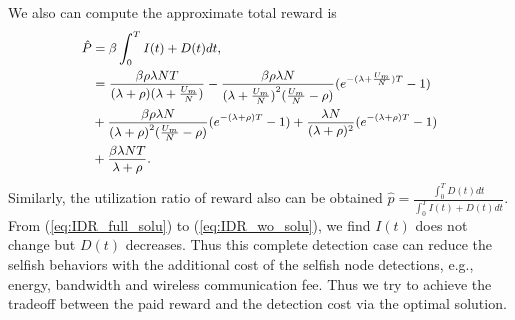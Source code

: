 We also can compute the approximate total reward is
\begin{equation}
\begin{small}
\nonumber
\begin{aligned}
\hat{P} &= \beta \int_{0}^{T} I(t) + D(t) dt, \\
& = \frac{\beta \rho \lambda N T}{ (\lambda + \rho)(\lambda + \frac{U_{m}}{N}) }
- \frac{\beta \rho \lambda N}{ {(\lambda + \frac{U_{m}}{N})}^{2} (\frac{U_{m}}{N} - \rho)}
(e^{-(\lambda + \frac{U_{m}}{N})T} - 1 ) \\
&+ \frac{\beta \rho \lambda N }{ {(\lambda + \rho)}^{2} (\frac{U_{m}}{N} - \rho) }
(e^{-(\lambda + \rho)T} - 1 )
+ \frac{ \lambda N }{ (\lambda + \rho)^2 } (e^{-(\lambda + \rho)T} - 1 ) \\
& + \frac{ \beta \lambda N T }{ \lambda + \rho }.
\end{aligned}
\end{small}
\end{equation}
Similarly, the utilization ratio of reward also can be obtained
$\hat{p} = \frac{\int_{0}^{T} D(t) dt}{\int_{0}^{T} I(t) + D(t) dt}$.
From (\ref{eq:IDR_full_solu}) to (\ref{eq:IDR_wo_solu}),
we find $I(t)$ does not change but $D(t)$ decreases.
Thus this complete detection case can reduce the selfish behaviors
with the additional cost of the selfish node detections,
e.g., energy, bandwidth and wireless communication fee.
Thus we try to achieve the tradeoff between the paid reward
and the detection cost
via the optimal solution.
